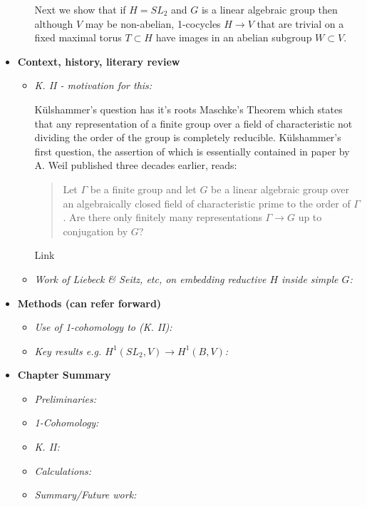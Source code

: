 \begin{itemize}
\begin{itemize}
		Next we show that if $H = SL_2$ and $G$ is a linear algebraic group then although $V$ may be non-abelian, 1-cocycles $H\rightarrow V$ that are trivial on a fixed maximal torus $T\subset H$ have images in an abelian subgroup $W\subset V$.
	\end{itemize}

	\item[] \textbf{Context, history, literary review}
	\begin{itemize}
		\item \emph{K. II - motivation for this:}
		
		K\"ulshammer's question has it's roots Maschke's Theorem which states that any representation of a finite group over a field of characteristic not dividing the order of the group is completely reducible. 
		K\"ulshammer's first question, the assertion of which is essentially contained in paper by A. Weil published three decades earlier, reads:
		\begin{quote}
			Let $\Gamma$ be a finite group and let $G$ be a linear algebraic group over an algebraically closed field of characteristic prime to the order of $\Gamma$. Are there only finitely many representations $\Gamma\rightarrow G$ up to conjugation by $G$?
		\end{quote}
		Link
		
		\item \emph{Work of Liebeck \& Seitz, etc, on embedding reductive $H$ inside simple $G$:}
		
	\end{itemize}

	\item[] \textbf{Methods (can refer forward)}
	\begin{itemize}
		\item \emph{Use of 1-cohomology to (K. II):}
		\item \emph{Key results e.g. $H^1(SL_2, V)\rightarrow H^1(B, V)$:}
	\end{itemize}
	
	\item[] \textbf{Chapter Summary}
	\begin{itemize}
		\item \emph{Preliminaries:}
		\item \emph{1-Cohomology:}
		\item \emph{K. II:}
		\item \emph{Calculations:}
		\item \emph{Summary/Future work:}
	\end{itemize}
\end{itemize}

